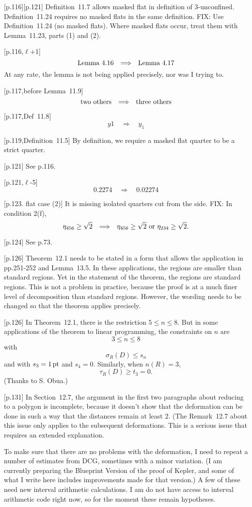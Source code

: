 \documentclass[11pt]{amsart}
\def\op#1{{\text{#1}}}
\def\to{{\quad\Longrightarrow\quad}}
\def\line{$\ell$}
\def\text{\hbox}
\begin{document}
[p.116][p.121] Definition~11.7 allows masked
flat in definition of $3$-unconfined.
Definition~11.24 requires no masked flats
in the same definition.  FIX: Use Definition~11.24 (no masked flats).  Where masked flats occur,
treat them with Lemma~11.23, parts (1) and (2).

[p.116,\line+1] 
	$$
	\text{Lemma}~4.16 \to \text{Lemma}~4.17
	$$
At any rate, the lemma is not being applied
precisely, nor was I trying to.

[p.117,before Lemma~11.9]
	$$
	\text{two others} \to \text{three others}
	$$
	
[p.117,Def~11.8]
    $$
    y1 \to y_1
    $$
    
 
[p.119,Definition~11.5]  By definition, we require a masked flat quarter to
be a strict quarter. 
	
[p.121] See p.116.

[p.121,\line-5]
	$$
	0.2274 \to 0.02274
	$$
	
[p.123. flat case (2)]  It is missing
isolated quarters cut from the side.
FIX: In condition 2(f), 
	$$
	\eta_{456}\ge\sqrt2 \to
	\eta_{456}\ge\sqrt2 \text{ or } \eta_{234}\ge\sqrt2.
	$$
	
[p.124] See p.73.
	
[p.126]  Theorem~12.1 needs to be stated in
a form that allows the application in pp.251-252
and Lemma~13.5.  In these applications, the
regions are smaller than standard regions.
Yet in the statement of the theorem, the regions
are standard regions.  This is not a problem
in practice, because the proof is at a much
finer level of decomposition than standard regions.
However, the wording needs to be changed so
that the theorem applies precisely.

[p.126] 
In Theorem~12.1, there is the restriction
	$5\le n\le 8$.
But in some applications of the theorem to
linear programming, the constraints on $n$
are   $$3\le n\le 8$$
with	$$\sigma_R(D)\le s_n$$
and with $s_3 = 1\,\op{pt}$ and $s_4=0$.
Similarly, when $n(R)=3$,
	$$\tau_R(D) \ge t_3 = 0.$$
(Thanks to S. Obua.)

[p.131]
In Section~12.7, the argument in the first two
paragraphs about reducing to a polygon is incomplete, because it doesn't show that the deformation can be done in such a way that the distances remain at least $2$.  (The Remark~12.7 about this issue only applies to the subsequent 
deformations.  This is a serious issue that requires an extended explanation.

To make sure that there are no problems with the deformation,
I need to repeat a number of estimates from DCG, sometimes with
a minor variation.  (I am currently preparing the Blueprint
Version of the proof of Kepler, and some of what I write here
includes improvements made for that version.)  A few of
these need new interval arithmetic calculations.  I am
do not have access to interval arithmetic code right now, so for the moment these remain hypotheses.
\end{document}
